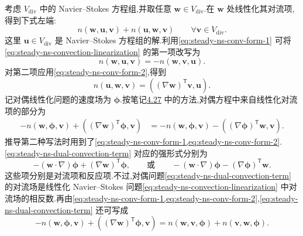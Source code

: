 \begin{note}[对偶线性化问题]
考虑 $V_{\mathrm{div}}$ 中的 Navier--Stokes 方程组,并取任意 $\bm{w}\in V_{\mathrm{div}}$.在 $\bm{w}$ 处线性化其对流项,得到下式左端:
\begin{equation}\label{eq:steady-ns-convection-linearization}
  n(\bm{w},\bm{u},\bm{v})
   +n(\bm{u},\bm{w},\bm{v})
   \qquad\forall\bm{v}\in V_{\mathrm{div}}.
\end{equation}
这里 $\bm{u}\in V_{\mathrm{div}}$ 是 Navier--Stokes 方程组的解.利用\cref{eq:steady-ns-conv-form-1} 可将\cref{eq:steady-ns-convection-linearization} 的第一项改写为
\[
  n(\bm{w},\bm{u},\bm{v})=-n(\bm{w},\bm{v},\bm{u}).
\]
对第二项应用\cref{eq:steady-ns-conv-form-2},得到
\[
  n(\bm{u},\bm{w},\bm{v})
    =((\nabla\bm{w})^{\mathsf T}\bm{v},\bm{u}).
\]
记对偶线性化问题的速度场为 $\symbf{\phi}$.按笔记\hyperref[note:stokes-regular-dual-problem]{4.27} 中的方法,对偶方程中来自线性化对流项的部分为
\begin{equation}\label{eq:steady-ns-dual-convection-term}
\begin{aligned}
  -n(\bm{w},\symbf{\phi},\bm{v})
   +((\nabla\bm{w})^{\mathsf T}\symbf{\phi},\bm{v})
  &=-n(\bm{w},\symbf{\phi},\bm{v})
    -((\nabla\symbf{\phi})^{\mathsf T}\bm{w},\bm{v}).
\end{aligned}
\end{equation}
推导第二种写法时用到了\cref{eq:steady-ns-conv-form-1,eq:steady-ns-conv-form-2}.\cref{eq:steady-ns-dual-convection-term} 对应的强形式分别为
\[
  -(\bm{w}\cdot\nabla)\symbf{\phi}
    +(\nabla\bm{w})^{\mathsf T}\symbf{\phi},
  \qquad\text{或}\qquad
  -(\bm{w}\cdot\nabla)\symbf{\phi}
    -(\nabla\symbf{\phi})^{\mathsf T}\bm{w}.
\]
这些项分别是对流项和反应项.不过,对偶问题\cref{eq:steady-ns-dual-convection-term} 的对流场是线性化 Navier--Stokes 问题\cref{eq:steady-ns-convection-linearization} 中对流场的相反数.再由\cref{eq:steady-ns-conv-form-1,eq:steady-ns-conv-form-2},\cref{eq:steady-ns-dual-convection-term} 还可写成
\begin{equation}\label{eq:steady-ns-dual-convection-skew}
  -n(\bm{w},\symbf{\phi},\bm{v})
    +((\nabla\bm{w})^{\mathsf T}\symbf{\phi},\bm{v})
   =n(\bm{w},\bm{v},\symbf{\phi})
    +n(\bm{v},\bm{w},\symbf{\phi}).
\end{equation}


\end{note}
